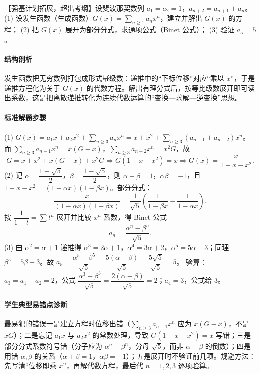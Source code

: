 \begin{problem}
【强基计划拓展，超出考纲】设斐波那契数列 $a_1=a_2=1$，$a_{n+2}=a_{n+1}+a_n$。
(1) 设发生函数（生成函数）$G(x)=\sum\limits_{n\ge1}a_nx^n$，建立并解出 $G(x)$ 的方程；
(2) 把 $G(x)$ 展开为部分分式，求通项公式（Binet 公式）；
(3) 验证 $a_5=5$。
\end{problem}
\begin{solution}
\paragraph{结构剖析}
发生函数把无穷数列打包成形式幂级数：递推中的“下标位移”对应“乘以 $x$”，于是递推方程化为关于 $G(x)$ 的代数方程。解出有理分式后，按等比级数展开即可读出系数，这是把离散递推转化为连续代数运算的“变换—求解—逆变换”思想。
\paragraph{标准解题步骤}
(1) $G(x)=a_1x+a_2x^2+\sum_{n\ge3}a_nx^n=x+x^2+\sum_{n\ge3}(a_{n-1}+a_{n-2})x^n$。
而 $\sum_{n\ge3}a_{n-1}x^n=x(G-x)$，$\sum_{n\ge3}a_{n-2}x^n=x^2G$，故
$$G=x+x^2+x(G-x)+x^2G\Rightarrow G(1-x-x^2)=x\Rightarrow G(x)=\frac{x}{1-x-x^2}.$$
(2) 记 $\alpha=\dfrac{1+\sqrt5}2$，$\beta=\dfrac{1-\sqrt5}2$，则 $\alpha+\beta=1$，$\alpha\beta=-1$，且 $1-x-x^2=(1-\alpha x)(1-\beta x)$。部分分式：
$$\frac{x}{(1-\alpha x)(1-\beta x)}
=\frac1{\sqrt5}\left(\frac{1}{1-\beta x}-\frac{1}{1-\alpha x}\right).$$
按 $\dfrac1{1-t}=\sum t^n$ 展开并比较 $x^n$ 系数，得 Binet 公式
$$a_n=\frac{\alpha^n-\beta^n}{\sqrt5}.$$
(3) 由 $\alpha^2=\alpha+1$ 递推得 $\alpha^3=2\alpha+1$，$\alpha^4=3\alpha+2$，$\alpha^5=5\alpha+3$；同理 $\beta^5=5\beta+3$。故
$a_5=\dfrac{\alpha^5-\beta^5}{\sqrt5}=\dfrac{5(\alpha-\beta)}{\sqrt5}=\dfrac{5\sqrt5}{\sqrt5}=5$。
验算：$a_3=a_1+a_2=2$，公式 $\dfrac{\alpha^3-\beta^3}{\sqrt5}=\dfrac{2(\alpha-\beta)}{\sqrt5}=2$；$a_4=3$，公式给 $3$。
\paragraph{学生典型易错点诊断}
最易犯的错误一是建立方程时位移出错（$\sum_{n\ge3}a_{n-1}x^n$ 应为 $x(G-x)$，不是 $xG$）；二是忘记 $a_1x$ 与 $a_2x^2$ 的常数处理，导致 $G(1-x-x^2)=x$ 写错；三是部分分式系数符号错（分子应为 $\alpha^n-\beta^n$，分母 $\sqrt5$，而非 $\alpha-\beta$ 的倒数）；四是用错 $\alpha,\beta$ 的关系（$\alpha+\beta=1$，$\alpha\beta=-1$）；五是展开时不验证前几项。规避方法：先写清“位移即乘 $x$”，再解代数方程，最后代 $n=1,2,3$ 逐项验算。
\end{solution}
